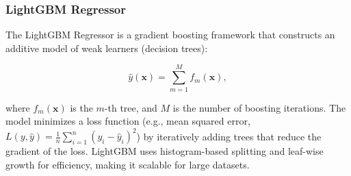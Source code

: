 \subsubsection{LightGBM Regressor}

The LightGBM Regressor \citep{ke2017lightgbm} is a gradient boosting framework that constructs an additive model of weak learners (decision trees):

\begin{equation}
\hat{y}(\mathbf{x}) = \sum_{m=1}^M f_m(\mathbf{x}),   
\end{equation}


where \( f_m(\mathbf{x}) \) is the \( m \)-th tree, and \( M \) is the number of boosting iterations. The model minimizes a loss function (e.g., mean squared error, \( L(y, \hat{y}) = \frac{1}{n} \sum_{i=1}^n (y_i - \hat{y}_i)^2 \)) by iteratively adding trees that reduce the gradient of the loss. LightGBM uses histogram-based splitting and leaf-wise growth for efficiency, making it scalable for large datasets.